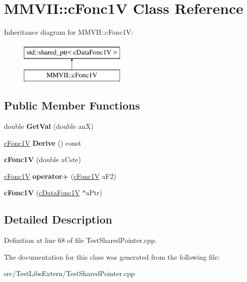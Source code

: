 \hypertarget{classMMVII_1_1cFonc1V}{}\section{M\+M\+V\+II\+:\+:c\+Fonc1V Class Reference}
\label{classMMVII_1_1cFonc1V}
Inheritance diagram for M\+M\+V\+II\+:\+:c\+Fonc1V\+:\begin{figure}[H]
\begin{center}
\leavevmode
\includegraphics[height=2.000000cm]{classMMVII_1_1cFonc1V}
\end{center}
\end{figure}
\subsection*{Public Member Functions}
\begin{DoxyCompactItemize}
\item 
double {\bfseries Get\+Val} (double anX)\hypertarget{classMMVII_1_1cFonc1V_a10203499475eea5d0265950dd70482b5}{}\label{classMMVII_1_1cFonc1V_a10203499475eea5d0265950dd70482b5}

\item 
\hyperlink{classMMVII_1_1cFonc1V}{c\+Fonc1V} {\bfseries Derive} () const \hypertarget{classMMVII_1_1cFonc1V_a5106aad703506a067a5f22ab63d23453}{}\label{classMMVII_1_1cFonc1V_a5106aad703506a067a5f22ab63d23453}

\item 
{\bfseries c\+Fonc1V} (double a\+Cste)\hypertarget{classMMVII_1_1cFonc1V_ae21bcef694acd452cf4449c57cdbeaa3}{}\label{classMMVII_1_1cFonc1V_ae21bcef694acd452cf4449c57cdbeaa3}

\item 
\hyperlink{classMMVII_1_1cFonc1V}{c\+Fonc1V} {\bfseries operator+} (\hyperlink{classMMVII_1_1cFonc1V}{c\+Fonc1V} a\+F2)\hypertarget{classMMVII_1_1cFonc1V_a05b558ebf963b41f6ffe96d8e950994e}{}\label{classMMVII_1_1cFonc1V_a05b558ebf963b41f6ffe96d8e950994e}

\item 
{\bfseries c\+Fonc1V} (\hyperlink{classMMVII_1_1cDataFonc1V}{c\+Data\+Fonc1V} $\ast$a\+Ptr)\hypertarget{classMMVII_1_1cFonc1V_ac4650f33c36cba88c4e0fdebfd9a303a}{}\label{classMMVII_1_1cFonc1V_ac4650f33c36cba88c4e0fdebfd9a303a}

\end{DoxyCompactItemize}


\subsection{Detailed Description}


Definition at line 68 of file Test\+Shared\+Pointer.\+cpp.



The documentation for this class was generated from the following file\+:\begin{DoxyCompactItemize}
\item 
src/\+Test\+Libs\+Extern/Test\+Shared\+Pointer.\+cpp\end{DoxyCompactItemize}
